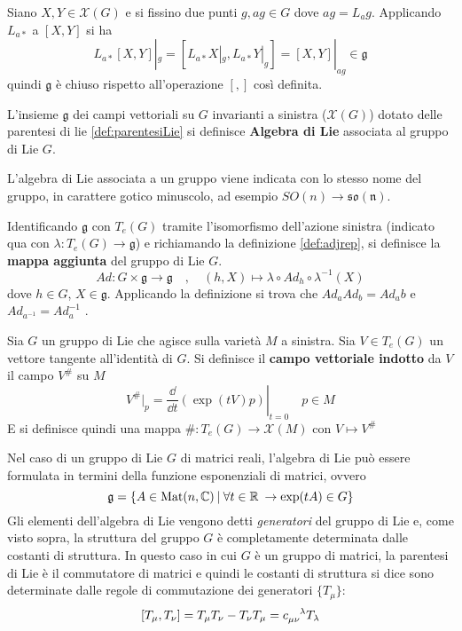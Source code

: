 Siano $X,Y \in \mathcal{X}(G)$ e si fissino due punti $g, ag \in G$ dove
$ag = L_a g$. Applicando $L_{a*}$ a $[X,Y]$ si ha
$$
   L_{a*}[X,Y]|_g = [L_{a*}X|_g,L_{a*}Y|_g] = [X,Y]|_{ag} \in \mathfrak{g}
$$
quindi $\mathfrak{g}$ è chiuso rispetto all'operazione $[,]$ così definita.\\

\begin{definition}\label{}
   L'insieme $\mathfrak{g}$ dei campi vettoriali su $G$ invarianti a sinistra
   ($\mathcal{X}(G)$)
   dotato delle parentesi di lie \ref{def:parentesiLie} si definisce
   \textbf{Algebra di Lie} associata al gruppo di Lie $G$.
\end{definition}
L'algebra di Lie associata a un gruppo viene indicata con lo stesso nome del gruppo,
in carattere gotico minuscolo, ad esempio $SO(n)\to \mathfrak{so(n)}$.\\

\begin{definition}
   Identificando $\mathfrak{g}$ con $T_e(G)$ tramite l'isomorfismo dell'azione sinistra
   (indicato qua con $\lambda : T_e(G) \to \mathfrak{g}$) e richiamando la definizione
   \ref{def:adjrep}, si definisce la \textbf{mappa aggiunta} del gruppo di Lie $G$.
   $$
      Ad : G \times \mathfrak{g} \to \mathfrak{g} \quad , \quad
      (h,X) \mapsto \lambda \circ Ad_h \circ \lambda^{-1}(X)
   $$
   dove $h \in G$, $X \in \mathfrak{g}$.
   Applicando la definizione si trova che $Ad_a Ad_b = Ad_ab$ e $Ad_{a^{-1}} = Ad_a^{-1}$ .\\
\end{definition}

\begin{definition}\label{def:inducedvectfield}
   Sia $G$ un gruppo di Lie che agisce sulla varietà $M$ a sinistra. Sia $V \in T_e(G)$
   un vettore tangente all'identità di $G$.
   Si definisce il \textbf{campo vettoriale indotto} da $V$ il campo $V^\#$ su $M$
   $$
      V^\# |_p = \left. \frac{\dd}{\dd t} (\exp(tV)p) \right |_{t=0} \quad p \in M
   $$
   E si definisce quindi una mappa $\# : T_e(G) \to \mathcal{X}(M)$
   con $V \mapsto V^\#$
\end{definition}

Nel caso di un gruppo di Lie $G$ di matrici reali, l'algebra di Lie può essere
formulata in termini della funzione esponenziali di matrici, ovvero
$$
\mathfrak{g} = \{ A \in \mathrm{Mat}(n,\mathbb{C}) \: | \:
\forall t \in \mathbb{R} \:\to \exp (tA) \in G \}
$$
Gli elementi dell'algebra di Lie vengono detti \emph{generatori} del gruppo di Lie
e, come visto sopra, la struttura del gruppo $G$ è completamente determinata
dalle costanti di struttura. In questo caso in cui $G$ è un gruppo di matrici,
la parentesi di Lie è il commutatore di matrici e quindi le costanti di struttura
si dice sono determinate dalle regole di commutazione dei generatori $\{T_\mu\}$:
$$
   [T_\mu, T_\nu] = T_\mu T_\nu - T_\nu T_\mu
      = c_{\mu\nu}^{\hphantom{\mu\nu}\lambda} T_\lambda
$$

